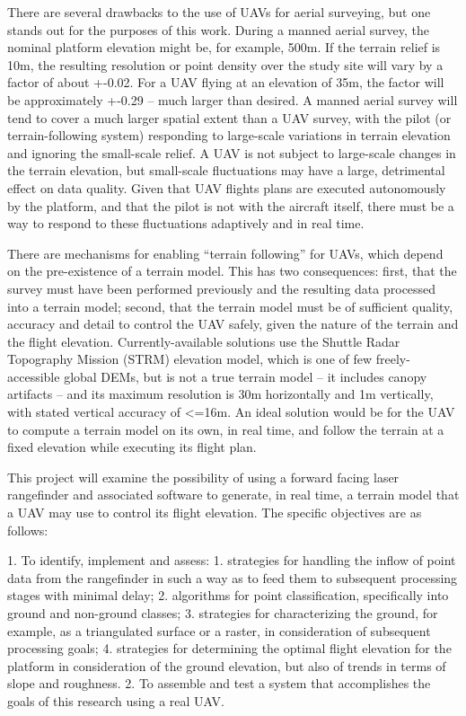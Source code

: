 \documentclass[10pt,a4paper]{report}
\begin{document}
There are several drawbacks to the use of UAVs for aerial surveying, but one stands out for the purposes of this work. During a manned aerial survey, the nominal platform elevation might be, for example, 500m. If the terrain relief is 10m, the resulting resolution or point density over the study site will vary by a factor of about +-0.02. For a UAV flying at an elevation of 35m, the factor will be approximately +-0.29 -- much larger than desired. A manned aerial survey will tend to cover a much larger spatial extent than a UAV survey, with the pilot (or terrain-following system) responding to large-scale variations in terrain elevation and ignoring the small-scale relief. A UAV is not subject to large-scale changes in the terrain elevation, but small-scale fluctuations may have a large, detrimental effect on data quality. Given that UAV flights plans are executed autonomously by the platform, and that the pilot is not with the aircraft itself, there must be a way to respond to these fluctuations adaptively and in real time.

There are mechanisms for enabling “terrain following” for UAVs, which depend on the pre-existence of a terrain model. This has two consequences: first, that the survey must have been performed previously and the resulting data processed into a terrain model; second, that the terrain model must be of sufficient quality, accuracy and detail to control the UAV safely, given the nature of the terrain and the flight elevation. Currently-available solutions use the Shuttle Radar Topography Mission (STRM) elevation model, which is one of few freely-accessible global DEMs, but is not a true terrain model -- it includes canopy artifacts -- and its maximum resolution is 30m horizontally and 1m vertically, with stated vertical accuracy of <=16m. An ideal solution would be for the UAV to compute a terrain model on its own, in real time, and follow the terrain at a fixed elevation while executing its flight plan. 

This project will examine the possibility of using a forward facing laser rangefinder and associated software to generate, in real time, a terrain model that a UAV may use to control its flight elevation. The specific objectives are as follows:

1. To identify, implement and assess:
1. strategies for handling the inflow of point data from the rangefinder in such a way as to feed them to subsequent processing stages with minimal delay;
2. algorithms for point classification, specifically into ground and non-ground classes;
3. strategies for characterizing the ground, for example, as a triangulated surface or a raster, in consideration of subsequent processing goals;
4. strategies for determining the optimal flight elevation for the platform in consideration of the ground elevation, but also of trends in terms of slope and roughness.
2. To assemble and test a system that accomplishes the goals of this research using a real UAV.
\end{document}
